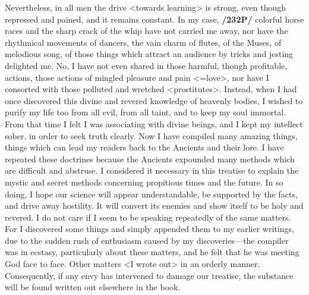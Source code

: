 Nevertheless, in all men the drive <towards learning> is strong, even though repressed and pained, and it remains constant. In my case, \textbf{/232P/} colorful horse races and the sharp crack of the whip have not carried me away, nor have the rhythmical movements of dancers, the vain charm of flutes, of the Muses, of melodious song, of those things which attract an audience by tricks and jesting delighted me. No, I have not even shared in those harmful, though profitable, actions, those actions of mingled pleasure and pain <=love>, nor have I consorted with those polluted and wretched <prostitutes>. Instead, when I had once discovered this divine and revered knowledge of heavenly bodies, I wished to purify my life too from all evil, from all taint, and to keep my soul immortal. From that time I felt I was associating with divine beings, and I kept my intellect sober, in order to seek truth clearly.
Now I have compiled many amazing things, things which can lead my readers back to the Ancients and their lore. I have repeated these doctrines because the Ancients expounded many methods which are
difficult and abstruse. I considered it necessary in this treatise to explain the mystic and secret methods concerning propitious times and the future. In so doing, I hope our science will appear understandable, be supported by the facts, and drive away hostility. It will convert its enemies and show itself to be holy and revered. I do not care if I seem to be speaking repeatedly of the same matters. For I discovered some
things and simply appended them to my earlier writings, due to the sudden rush of enthusiasm caused by my discoveries—the compiler was in ecstasy, particularly about these matters, and he felt that he was meeting God face to face. Other matters <I wrote out> in an orderly manner. Consequently, if any envy has intervened to damage our treatise, the substance will be found written out elsewhere in the book.

\newpage